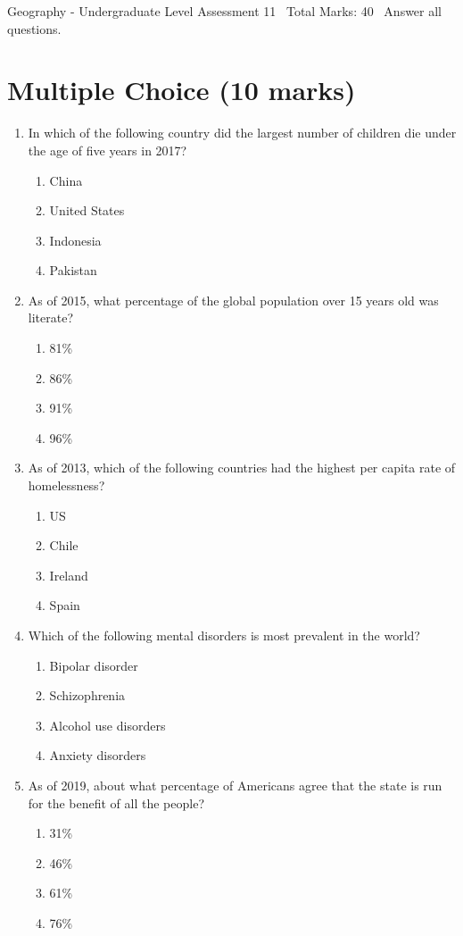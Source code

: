 \documentclass[12pt]{article}
\begin{document}
\begin{center}
Geography - Undergraduate Level Assessment 11 \
Total Marks: 40 \
Answer all questions.
\end{center}

\section*{Multiple Choice (10 marks)}
\begin{enumerate}[label=\arabic*.]
\item In which of the following country did the largest number of children die under the age of five years in 2017?
\begin{enumerate}[label=(\alph*)]
    \item China
    \item United States
    \item Indonesia
    \item Pakistan
\end{enumerate}
\item As of 2015, what percentage of the global population over 15 years old was literate?
\begin{enumerate}[label=(\alph*)]
    \item 81\%
    \item 86\%
    \item 91\%
    \item 96\%
\end{enumerate}
\item As of 2013, which of the following countries had the highest per capita rate of homelessness?
\begin{enumerate}[label=(\alph*)]
    \item US
    \item Chile
    \item Ireland
    \item Spain
\end{enumerate}
\item Which of the following mental disorders is most prevalent in the world?
\begin{enumerate}[label=(\alph*)]
    \item Bipolar disorder
    \item Schizophrenia
    \item Alcohol use disorders
    \item Anxiety disorders
\end{enumerate}
\item As of 2019, about what percentage of Americans agree that the state is run for the benefit of all the people?
\begin{enumerate}[label=(\alph*)]
    \item 31\%
    \item 46\%
    \item 61\%
    \item 76\%
\end{enumerate}
\end{enumerate}
\end{document}
